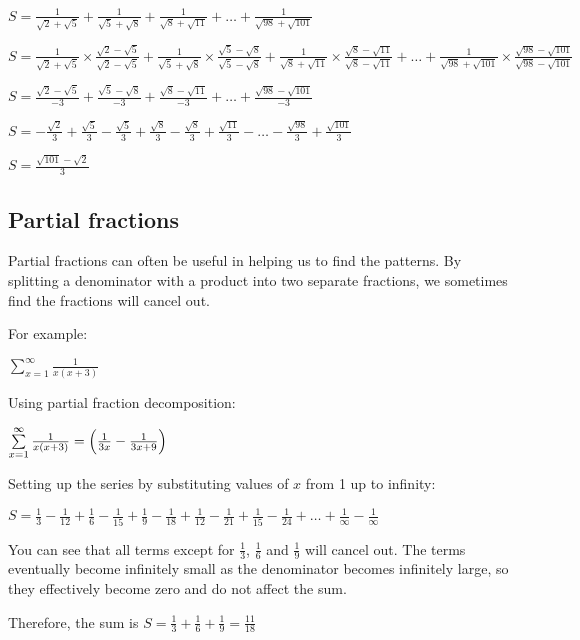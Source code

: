 \documentclass[../main.tex]{subfiles}
\begin{document}
$S=\frac{1}{\sqrt{2}+\sqrt{5}}+\frac{1}{\sqrt{5}+\sqrt{8}}+\frac{1}{\sqrt{8}+\sqrt{11}}+\dots +\frac{1}{\sqrt{98}+\sqrt{101}}$

$S=\frac{1}{\sqrt{2}+\sqrt{5}}\times \frac{\sqrt{2}-\sqrt{5}}{\sqrt{2}-\sqrt{5}}+\frac{1}{\sqrt{5}+\sqrt{8}}\times \frac{\sqrt{5}-\sqrt{8}}{\sqrt{5}-\sqrt{8}}+\frac{1}{\sqrt{8}+\sqrt{11}}\times \frac{\sqrt{8}-\sqrt{11}}{\sqrt{8}-\sqrt{11}}+\dots +\frac{1}{\sqrt{98}+\sqrt{101}}\times \frac{\sqrt{98}-\sqrt{101}}{\sqrt{98}-\sqrt{101}}$

$S=\frac{\sqrt{2}-\sqrt{5}}{-3}+\frac{\sqrt{5}-\sqrt{8}}{-3}+\frac{\sqrt{8}-\sqrt{11}}{-3}+\dots +\frac{\sqrt{98}-\sqrt{101}}{-3}$

$S=-\frac{\sqrt{2}}{3}+\frac{\sqrt{5}}{3}-\frac{\sqrt{5}}{3}+\frac{\sqrt{8}}{3}-\frac{\sqrt{8}}{3}+\frac{\sqrt{11}}{3}-\dots -\frac{\sqrt{98}}{3}+\frac{\sqrt{101}}{3}$

$S=\frac{\sqrt{101}-\sqrt{2}}{3}$

\subsection*{Partial fractions}
Partial fractions can often be useful in helping us to find the patterns. By splitting a denominator with a product into two separate fractions, we sometimes find the fractions will cancel out.

For example:

\(\sum\limits_{x=1}^\infty \frac{1}{x(x+3)}\)

Using partial fraction decomposition:

\(\sum\limits_{x=1}^\infty \frac{1}{x(x+3)}=\Bigl(\frac{1}{3x}-\frac{1}{3x+9}\Bigr)\)

Setting up the series by substituting values of $x$ from 1 up to infinity:

$S=\frac{1}{3}-\frac{1}{12}+\frac{1}{6}-\frac{1}{15}+\frac{1}{9}-\frac{1}{18}+\frac{1}{12}-\frac{1}{21}+\frac{1}{15}-\frac{1}{24}+\dots +\frac{1}{\infty}-\frac{1}{\infty}$

You can see that all terms except for $\frac{1}{3}$, $\frac{1}{6}$ and $\frac{1}{9}$ will cancel out. The terms eventually become infinitely small as the denominator becomes infinitely large, so they effectively become zero and do not affect the sum.

Therefore, the sum is $S=\frac{1}{3}+\frac{1}{6}+\frac{1}{9}=\frac{11}{18}$

\pagebreak
\end{document}
